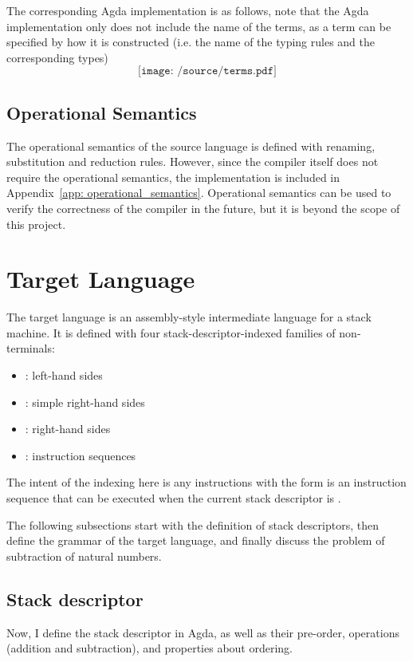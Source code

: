\documentclass[12pt,a4paper]{report}
\theoremstyle{definition}
\newcommand{\bracket}[1]{\mathord{<} #1 \mathord{>}}
\begin{document}
        The corresponding Agda implementation is as follows, note that the Agda implementation only does not include the name of the terms, as a term can be specified by how it is constructed (i.e. the name of the typing rules and the corresponding types)
        \[\texttt{[image: /source/terms.pdf]}\]

        \subsection{Operational Semantics}
        The operational semantics of the source language is defined with renaming, substitution and reduction rules. However, since the compiler itself does not require the operational semantics, the implementation is included in Appendix~\ref{app: operational_semantics}. Operational semantics can be used to verify the correctness of the compiler in the future, but it is beyond the scope of this project.


    \section{Target Language} \label{sec: target}
    The target language is an assembly-style intermediate language for a stack machine. It is defined with four stack-descriptor-indexed families of non-terminals: 
    \begin{itemize}
        \item 
            \text{\bracket{\textsf{L}_{\textit{sd}}}}: left-hand sides
        \item 
            \text{\bracket{\textsf{S}_{\textit{sd}}}}: simple right-hand sides
        \item
            \text{\bracket{\textsf{R}_{\textit{sd}}}}: right-hand sides
        \item
            \text{\bracket{\textsf{I}_{\textit{sd}}}}: instruction sequences
    \end{itemize}
    The intent of the indexing here is any instructions with the form \text{\bracket{\textsf{I}_{\textit{sd}}}} is an instruction sequence that can be executed when the current stack descriptor is . 

    The following subsections start with the definition of stack descriptors, then define the grammar of the target language, and finally discuss the problem of subtraction of natural numbers.

    \subsection{Stack descriptor}
    Now, I define the stack descriptor in Agda, as well as their pre-order, operations (addition and subtraction), and properties about ordering.
\end{document}
